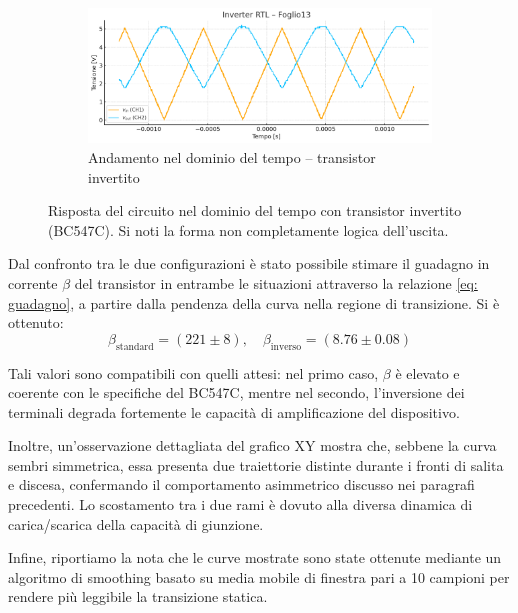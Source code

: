 \documentclass[a4paper,12pt]{article}
\begin{document}
\begin{figure}[H]
  \centering
  \begin{subfigure}{0.9\textwidth}
    \includegraphics[width=\linewidth]{Triangolare_inver.png}
    \caption{Andamento nel dominio del tempo – transistor invertito}
  \end{subfigure}
  \caption{Risposta del circuito nel dominio del tempo con transistor invertito (BC547C). Si noti la forma non completamente logica dell’uscita.}
  \label{fig: inverter-invertito}
\end{figure}

Dal confronto tra le due configurazioni è stato possibile stimare il guadagno in corrente \(\beta\) del transistor in entrambe le situazioni attraverso la relazione \ref{eq: guadagno}, a partire dalla pendenza della curva nella regione di transizione. Si è ottenuto:
\[
\beta_{\text{standard}} = (221 \pm 8), \quad \beta_{\text{inverso}} = (8.76 \pm 0.08)
\]

Tali valori sono compatibili con quelli attesi: nel primo caso, \(\beta\) è elevato e coerente con le specifiche del BC547C, mentre nel secondo, l’inversione dei terminali degrada fortemente le capacità di amplificazione del dispositivo.

Inoltre, un’osservazione dettagliata del grafico XY mostra che, sebbene la curva sembri simmetrica, essa presenta due traiettorie distinte durante i fronti di salita e discesa, confermando il comportamento asimmetrico discusso nei paragrafi precedenti. Lo scostamento tra i due rami è dovuto alla diversa dinamica di carica/scarica della capacità di giunzione.

\medskip

Infine, riportiamo la nota che le curve mostrate sono state ottenute mediante un algoritmo di smoothing basato su media mobile di finestra pari a 10 campioni per rendere più leggibile la transizione statica.



\end{document}
